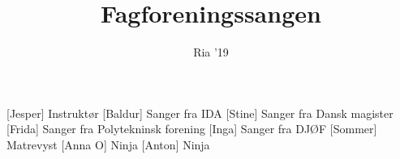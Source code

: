 \documentclass[a4paper,11pt]{article}
\title{Fagforeningssangen}
\author{Ria '19}
\begin{document}
\maketitle

\begin{roles}
[Jesper] Instruktør
[Baldur] Sanger fra IDA
[Stine] Sanger fra Dansk magister
[Frida] Sanger fra Polytekninsk forening
[Inga] Sanger fra DJØF
[Sommer] Matrevyst
[Anna O] Ninja
[Anton] Ninja
\end{roles}

\begin{props}
\end{props}
\end{document}
